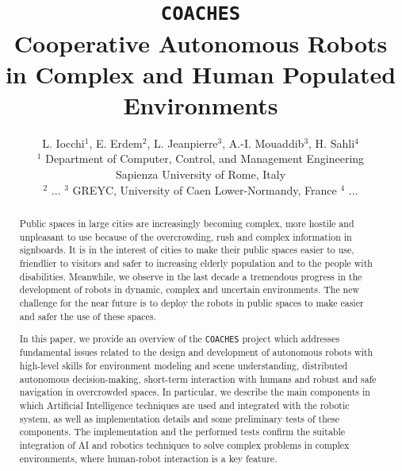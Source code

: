 \documentclass{llncs}
\def\coaches{{\tt COACHES} }
\begin{document}
%
%
%
%
\title{\coaches\\
Cooperative Autonomous Robots in Complex and Human Populated Environments}
%
%
\author{L. Iocchi$^1$,  E. Erdem$^2$,  L. Jeanpierre$^3$, A.-I. Mouaddib$^3$, H. Sahli$^4$ \\
$^1$ Department of Computer, Control, and Management Engineering\\ 
Sapienza University of Rome, Italy\\
$^2$ ...
$^3$ GREYC, University of Caen Lower-Normandy, France
$^4$ ...
}

\institute{}
\date{}

%
%

\maketitle              %

\begin{abstract}

Public spaces in large cities are increasingly becoming complex, more hostile and  
unpleasant to use because of the overcrowding, rush and complex information in signboards. 
It is in the interest of cities to make their public spaces easier to use, friendlier to visitors and safer to increasing elderly population and to the people with disabilities. 
Meanwhile, we observe in the last decade a tremendous progress in the development of robots in dynamic, complex and uncertain environments. The new challenge for the near future is to deploy the robots in public spaces to make easier and safer the use of these spaces. 

In this paper, we provide an overview of the \coaches project which addresses fundamental issues related to the design and development of autonomous robots with high-level skills for environment modeling and scene understanding, distributed autonomous decision-making, short-term interaction with humans and robust and safe navigation in overcrowded spaces. 
In particular, we describe the main components in which Artificial Intelligence techniques are used and integrated with the robotic system, as well as implementation details and some preliminary tests of these components. The implementation and the performed tests confirm the suitable integration of AI and robotics techniques to solve complex problems in complex environments, where human-robot interaction is a key feature.

\end{abstract}
\end{document}
